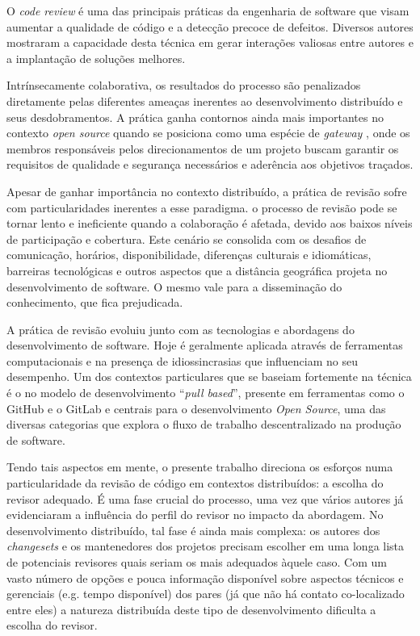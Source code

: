 \documentclass[12pt,openany,oneside,a4paper,english,brazil]{abntbibufjf}
\begin{document}
O \textit{code review} é uma das principais práticas da engenharia de software que visam aumentar a qualidade de código e a detecção precoce de defeitos. Diversos autores mostraram a capacidade desta técnica em gerar interações valiosas entre autores e a implantação de soluções melhores.

Intrínsecamente colaborativa, os resultados do processo são penalizados diretamente pelas diferentes ameaças inerentes ao desenvolvimento distribuído e seus desdobramentos. A prática ganha contornos ainda mais importantes no contexto \textit{open source} quando se posiciona como uma espécie de \textit{gateway} , onde os membros responsáveis pelos direcionamentos de um projeto buscam garantir os requisitos de qualidade e segurança necessários e aderência aos objetivos traçados.

Apesar de ganhar importância no contexto distribuído, a prática de revisão sofre com particularidades inerentes a esse paradigma. o  processo de revisão pode se tornar lento e ineficiente quando a colaboração é afetada, devido aos baixos níveis de participação e cobertura. Este cenário se consolida com os desafios de comunicação, horários, disponibilidade, diferenças culturais e idiomáticas, barreiras tecnológicas e outros aspectos que a distância geográfica projeta no desenvolvimento de software. O mesmo vale para a disseminação do conhecimento, que fica prejudicada.

A prática de revisão evoluiu junto com as tecnologias e abordagens do desenvolvimento de software. Hoje é geralmente aplicada através de ferramentas computacionais e na presença de idiossincrasias que influenciam no seu desempenho. Um dos contextos particulares que se baseiam fortemente na técnica é o no modelo de desenvolvimento ``\textit{pull based}'', presente em ferramentas como o GitHub e o GitLab e centrais para o desenvolvimento \textit{Open Source}, uma das diversas categorias que explora o fluxo de trabalho descentralizado na produção de software.

Tendo tais aspectos em mente, o presente trabalho direciona os esforços numa particularidade da revisão de código em contextos distribuídos: a escolha do revisor adequado. É uma fase crucial do processo, uma vez que vários autores já evidenciaram a influência do perfil do revisor no impacto da abordagem. No desenvolvimento distribuído, tal fase é ainda mais complexa: os autores dos \textit{changesets} e os mantenedores dos projetos precisam escolher em uma longa lista de potenciais revisores quais seriam os mais adequados àquele caso. Com um vasto número de opções e pouca informação disponível sobre aspectos técnicos e gerenciais (e.g. tempo disponível) dos pares (já que não há contato co-localizado entre eles) a natureza distribuída deste tipo de desenvolvimento dificulta a escolha do revisor.
\end{document}
